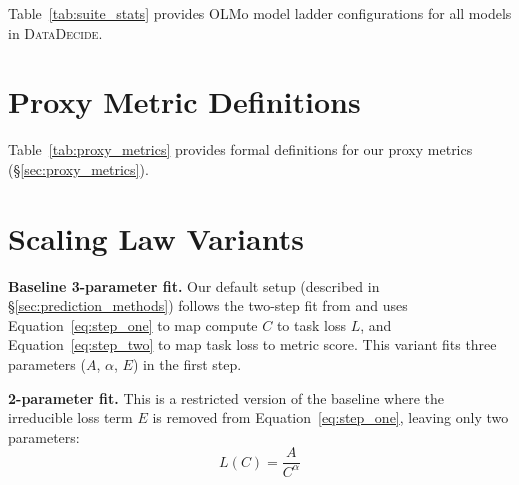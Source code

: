 \documentclass{article}
\theoremstyle{plain}
\theoremstyle{definition}
\theoremstyle{remark}
\newcommand{\projSuite}{\textsc{DataDecide}}
\newcommand{\primaryMetric}{\textsc{Accuracy}}
\begin{document}
Table~\ref{tab:suite_stats} provides OLMo model ladder configurations for all models in \projSuite{}.

\section{Proxy Metric Definitions}
\begin{table}[]
    \centering
    
    \caption{Proxy metrics used as alternative inputs to our prediction methods, $C^{(i)}$ is the set of possible continuations for item $i$ and $N$ is the number of items in a benchmark. Each each of the first 5 metrics have  and  variants in which likelihoods are normalized as defined in the bottom two rows.
    }
    \label{tab:proxy_metrics}
\end{table}

Table~\ref{tab:proxy_metrics} provides formal definitions for our proxy metrics (\S\ref{sec:proxy_metrics}).

\begin{table}
\small
\centering

\caption{Average prediction error for 1B targets for the different scaling law setups across tasks and recipes on \primaryMetric{} fit to all models but 1B. We see that other than the single step and 5-parameter variants errors are comparable, and these variants also roughly follow the compute-decision frontier in Figure~\ref{fig:all_scaling_laws_accuracy_vs_compute_shaded}. }
\label{tab:setup-errors}
\end{table}
\section{Scaling Law Variants}
\label{app:alternative-scaling-law-fits}

\textbf{Baseline 3-parameter fit.}  
Our default setup (described in \S\ref{sec:prediction_methods}) follows the two-step fit from \citep{bhagia2024establishingtaskscalinglaws} and uses Equation~\ref{eq:step_one} to map compute $C$ to task loss $L$, and Equation~\ref{eq:step_two} to map task loss to metric score. This variant fits three parameters ($A$, $\alpha$, $E$) in the first step.

\textbf{2-parameter fit.}  
This is a restricted version of the baseline where the irreducible loss term $E$ is removed from Equation~\ref{eq:step_one}, leaving only two parameters:
\begin{equation}
\label{eq:step_one_no_E_repeat}
L(C)=\frac{A}{C^\alpha}
\end{equation}
\end{document}
